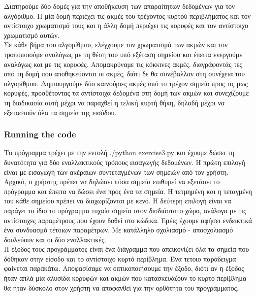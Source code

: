\documentclass[12pt]{article}
\begin{document}
Διατηρούμε δύο δομές για την αποθήκευση των απαραίτητων δεδομένων για τον αλγόριθμο. Η μία δομή περιέχει τις ακμές του τρέχοντος κυρτού περιβλήματος και τον αντίστοιχο χρωματισμό τους και η άλλη δομή περιέχει τις κορυφές και τον αντίστοιχο χρωματισμό αυτών. \\

Σε κάθε βήμα του αλγορίθμου, ελέγχουμε τον χρωματισμό των ακμών και τον τροποποιούμε αναλόγως με τη θέση του υπό εξέταση σημείου και έπειτα ενεργούμε αναλόγως και με τις κορυφές. Απομακρύναμε τις κόκκινες ακμές, διαγράφοντάς τες από τη δομή που αποθηκεύονται οι ακμές, διότι δε θα συνέβαλλαν στη συνέχεια του αλγορίθμου. Δημιουργούμε δύο καινούριες ακμές από το τρέχον σημείο προς τις μως κορυφές, προσθέτοντας τα αντίστοιχα δεδομένα στη δομή των ακμών και συνεχίζουμε τη διαδικασία αυτή μέχρι να παραχθεί η τελική κυρτή θήκη, δηλαδή μέχρι να εξεταστούν όλα τα σημεία της εισόδου. \\

\subsubsection*{Running the code}

Το πρόγραμμα τρέχει με την εντολή ./python exercise3.py και έχουμε δώσει τη δυνατότητα για δύο εναλλακτικούς τρόπους εισαγωγής δεδομένων. Η πρώτη επιλογή είναι με εισαγωγή των ακέραιων συντεταγμένων των σημειών από τον χρήστη. Αρχικά, ο χρήστης πρέπει να δηλώσει πόσα σημεία επιθυμεί να εξετάσει το πρόγραμμα και έπειτα να δώσει ένα προς ένα τα σημεία. Η τετμημένη και η τεταγμένη του κάθε σημείου πρέπει να διαχωρίζονται με κενό. Η δεύτερη επιλογή είναι να παράγει το ίδιο το πρόγραμμα τυχαία σημεία στον δισδιάστατο χώρο, ανάλογα με τις αντίστοιχες παραμέτρους που έχουν δοθεί στο κώδικα. Εμέις έχουμε αφήσει ενδεικτικά ένα συνδυασμό τέτοιων παραμέτρων. Με κατάλληλο σχολιασμό - αποσχολιασμό δουλεύουν και οι δύο εναλλακτικές. \\

Η έξοδος τους προγράμματος είναι ένα διάγραμμα που απεικονίζει όλα τα σημεία που δόθηκαν στην είσοδο και το αντίστοιχο κυρτό περίβλημα. Ένα τετοιο παράδειγμα φαίνεται παρακάτω. Αποφασίσαμε να οπτικοποιήσουμε την έξοδο, διότι αν η έξοδος ήταν απλά μία αλυσίδα κορυφών και ακμών που κατασκευάζουν το κυρτό περίβλημα θα ήταν δύσκολο στον χρήστη να αποφανθεί για την ορθότητα του προγράμματος. \\
\end{document}
